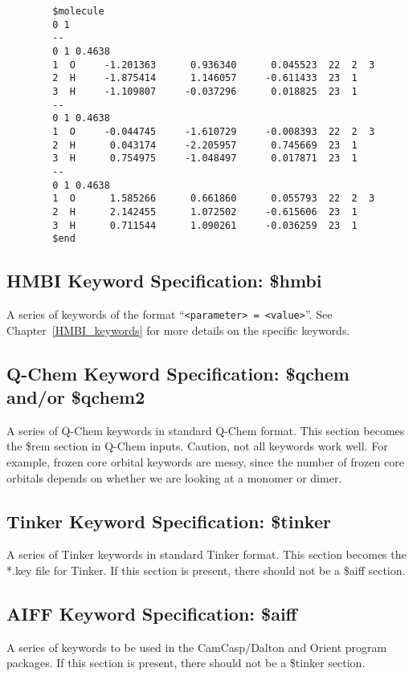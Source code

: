 \documentclass[11pt,letterpaper]{article}
\begin{document}
\begin{spacing}{1.0}
\begin{verbatim}
        $molecule
        0 1
        --
        0 1 0.4638
        1  O     -1.201363      0.936340      0.045523  22  2  3
        2  H     -1.875414      1.146057     -0.611433  23  1
        3  H     -1.109807     -0.037296      0.018825  23  1
        --
        0 1 0.4638
        1  O     -0.044745     -1.610729     -0.008393  22  2  3 
        2  H      0.043174     -2.205957      0.745669  23  1
        3  H      0.754975     -1.048497      0.017871  23  1 
        --
        0 1 0.4638
        1  O      1.585266      0.661860      0.055793  22  2  3
        2  H      2.142455      1.072502     -0.615606  23  1
        3  H      0.711544      1.090261     -0.036259  23  1
        $end
\end{verbatim}
\hrulefill
\vspace{5mm}


\subsection{HMBI Keyword Specification: \$hmbi}
A series of keywords of the format ``{\tt <parameter> = <value>}''.
See Chapter~\ref{HMBI_keywords} for more details on the specific
keywords.

\subsection{Q-Chem Keyword Specification: \$qchem and/or \$qchem2} 
	A series of Q-Chem keywords in standard Q-Chem format. This
	section becomes the \$rem section in Q-Chem inputs.   Caution,
        not all keywords work well.  For example, frozen core orbital
        keywords are messy, since the number of frozen core orbitals
        depends on whether we are looking at a monomer or dimer.

\subsection{Tinker Keyword Specification: \$tinker \label{sec-tinker}}
   	A series of Tinker keywords in standard Tinker format.  This
	section becomes the *.key file for Tinker.  If this section is
        present, there should not be a \$aiff section.

\subsection{AIFF Keyword Specification: \$aiff}
   	A series of keywords to be used in the CamCasp/Dalton and Orient
        program packages.  If this section is
        present, there should not be a \$tinker section.


\end{spacing}
\end{document}
